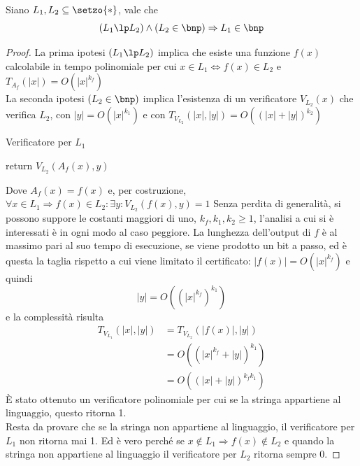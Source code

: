 \begin{theorem}
    \label{teo:riduzioneanp}
    Siano $L_1, L_2 \subseteq \setzo{*}$, vale che
    \begin{equation*}
        \left( L_1 \lp L_2 \right) \wedge \left( L_2 \in \bnp \right) \Rightarrow L_1 \in \bnp
    \end{equation*}
\end{theorem}
\begin{proof}
    La prima ipotesi $( L_1 \lp L_2 )$ implica che esiste una funzione $f(x)$ calcolabile in tempo polinomiale per cui $x \in L_1 \Leftrightarrow f(x) \in L_2 $ e $ T_{A_{f}} (|x|) = O ( |x|^{k_f} ) $
    \\
    La seconda ipotesi $ \left( L_2 \in \bnp \right) $ implica l'esistenza di un verificatore $V_{L_{2}}(x)$ che verifica $L_2$,
    con $ |y| = O ( |x|^{k_1} ) $ e 
    con $ T_{V_{L_{2}}} (|x|, |y|) = O ( ( |x|+|y| )^{k_2} ) $
    \begin{algorithm}[H]
    \caption{Verificatore per $L_1$}\label{alg:verificatorel1}
    \begin{algorithmic}[1]
            \State return $V_{L_2} (A_f (x), y)$
        \EndProcedure
    \end{algorithmic}
    \end{algorithm}
    \noindent
    Dove $A_f(x) = f(x)$
    e, per costruzione, 
    $
        \forall x \in L_1 \Rightarrow f(x) \in L_2 : \exists y : 
        V_{L_2} (f (x), y) = 1
    $
    Senza perdita di generalità, si possono suppore le costanti maggiori di uno, $k_f, k_1, k_2 \geq 1$, l'analisi a cui si è interessati è in ogni modo al caso peggiore.
    La lunghezza dell'output di $f$ è al massimo pari al suo tempo di esecuzione, se viene prodotto un bit a passo, ed è questa la taglia rispetto a cui viene limitato il certificato:
    $ |f(x)| = O ( |x|^{k_f} ) $
    e quindi
    \begin{equation*}
        |y| = O \left( \left( |x|^{k_f} \right)^{k_1} \right)
    \end{equation*}
    e la complessità risulta
    \begin{align*}
        T_{V_{L_{1}}} (|x|, |y|)
        &= T_{V_{L_{2}}} (|f(x)|, |y|)
        \\
        &= O \left( \left( |x|^{k_f} + |y| \right)^{k_1} \right)
        \\
        &= O \left( \left( |x| + |y| \right)^{k_f k_1} \right)
    \end{align*}
    È stato ottenuto un verificatore polinomiale per cui se la stringa appartiene al linguaggio, questo ritorna 1.
    \\
    Resta da provare che se la stringa non appartiene al linguaggio, il verificatore per $L_1$ non ritorna mai 1. Ed è vero perché se $x \notin L_1 \Rightarrow f(x) \notin L_2$ e quando la stringa non appartiene al linguaggio il verificatore per $L_2$ ritorna sempre 0.
\end{proof}

